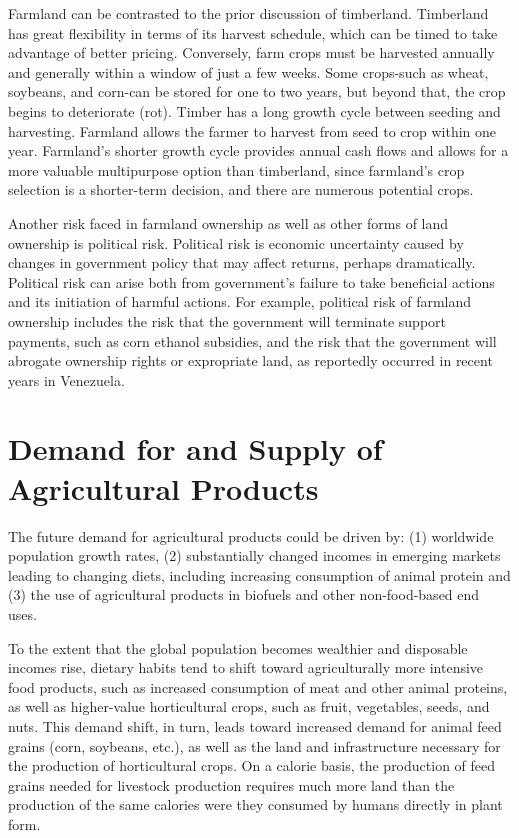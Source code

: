 \documentclass[11pt]{article}
\begin{document}
Farmland can be contrasted to the prior discussion of timberland. Timberland has great flexibility in terms of its harvest schedule, which can be timed to take advantage of better pricing. Conversely, farm crops must be harvested annually and generally within a window of just a few weeks. Some crops-such as wheat, soybeans, and corn-can be stored for one to two years, but beyond that, the crop begins to deteriorate (rot). Timber has a long growth cycle between seeding and harvesting. Farmland allows the farmer to harvest from seed to crop within one year. Farmland's shorter growth cycle provides annual cash flows and allows for a more valuable multipurpose option than timberland, since farmland's crop selection is a shorter-term decision, and there are numerous potential crops.

Another risk faced in farmland ownership as well as other forms of land ownership is political risk. Political risk is economic uncertainty caused by changes in government policy that may affect returns, perhaps dramatically. Political risk can arise both from government's failure to take beneficial actions and its initiation of harmful actions. For example, political risk of farmland ownership includes the risk that the government will terminate support payments, such as corn ethanol subsidies, and the risk that the government will abrogate ownership rights or expropriate land, as reportedly occurred in recent years in Venezuela.

\section*{Demand for and Supply of Agricultural Products}
The future demand for agricultural products could be driven by: (1) worldwide population growth rates, (2) substantially changed incomes in emerging markets leading to changing diets, including increasing consumption of animal protein and (3) the use of agricultural products in biofuels and other non-food-based end uses.

To the extent that the global population becomes wealthier and disposable incomes rise, dietary habits tend to shift toward agriculturally more intensive food products, such as increased consumption of meat and other animal proteins, as well as higher-value horticultural crops, such as fruit, vegetables, seeds, and nuts. This demand shift, in turn, leads toward increased demand for animal feed grains (corn, soybeans, etc.), as well as the land and infrastructure necessary for the production of horticultural crops. On a calorie basis, the production of feed grains needed for livestock production requires much more land than the production of the same calories were they consumed by humans directly in plant form.
\end{document}
